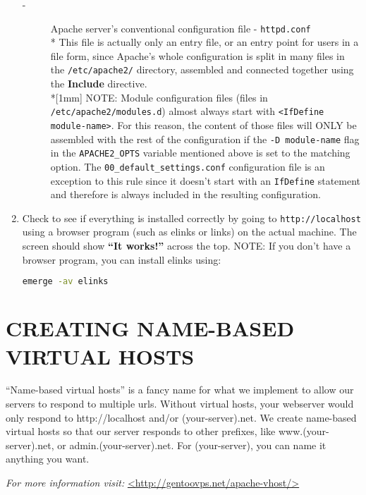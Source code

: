 \documentclass[11pt]{article}
\begin{document}
\begin{enumerate}
\begin{description}
     \item[-]Apache server's conventional configuration file - \verb|httpd.conf|
      \\*  This file is actually only an entry file, or an entry point for users in a file form, since Apache's whole configuration is split in many files in the \verb|/etc/apache2/| directory, assembled and connected together using the \textbf{Include} directive.
      \\*[1mm] NOTE: Module configuration files (files in \verb|/etc/apache2/modules.d|) almost always start with \verb|<IfDefine module-name>|. For this reason, the content of those files will ONLY be assembled with the rest of the configuration if the \verb|-D module-name| flag in the \verb|APACHE2_OPTS| variable mentioned above is set to the matching option. The \verb|00_default_settings.conf| configuration file is an exception to this rule since it doesn't start with an \verb|IfDefine| statement and therefore is always included in the resulting configuration.
    \end{description}
    
  \item Check to see if everything is installed correctly by going to \verb|http://localhost| using a browser program (such as elinks or links) on the actual machine. The screen should show \textbf{``It works!''} across the top. NOTE: If you don't have a browser program, you can install elinks using:
  \begin{lstlisting}[basicstyle=\ttfamily, backgroundcolor = \color{lightgray}, language = bash, xleftmargin = 0cm, framexleftmargin = 1em] 
emerge -av elinks
\end{lstlisting}

\end {enumerate}

\section*{CREATING NAME-BASED VIRTUAL HOSTS}
``Name-based virtual hosts'' is a fancy name for what we implement to allow our servers to respond to multiple urls. Without virtual hosts, your webserver would only respond to http://localhost and/or (your-server).net. We create name-based virtual hosts so that our server responds to other prefixes, like www.(your-server).net, or admin.(your-server).net. For (your-server), you can name it anything you want.

\textit{For more information visit:}
\url{<http://gentoovps.net/apache-vhost/>}
\end{document}
